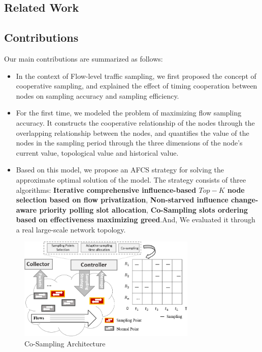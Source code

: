\documentclass[conference]{IEEEtran}
\begin{document}
\subsection{Related Work}

\subsection{Contributions}

Our main contributions are summarized as follows:
\begin{itemize}[leftmargin=*]
\setlength{\parindent}{0pt}

\item In the context of Flow-level traffic sampling, we first proposed the concept of cooperative sampling, and explained the effect of timing cooperation between nodes on sampling accuracy and sampling efficiency.
\item For the first time, we modeled the problem of maximizing flow sampling accuracy. It constructs the cooperative relationship of the nodes through the overlapping relationship between the nodes, and quantifies the value of the nodes in the sampling period through the three dimensions of the node's current value, topological value and historical value.
\item Based on this model, we propose an AFCS strategy for solving the approximate optimal solution of the model. The strategy consists of three algorithms: \textbf{Iterative comprehensive influence-based $Top-K$ node selection based on flow privatization}, \textbf{Non-starved influence change-aware priority polling slot allocation}, \textbf{Co-Sampling slots ordering based on effectiveness maximizing greed}.And, We evaluated it through a real large-scale network topology.
\end{itemize}

\begin{figure}[!hhhhhhhhhht]
\centering
\includegraphics[width=8.5cm]{images/png_architecture.png}
\caption{Co-Sampling Architecture}
\label{Architecture}
\end{figure}
\end{document}
